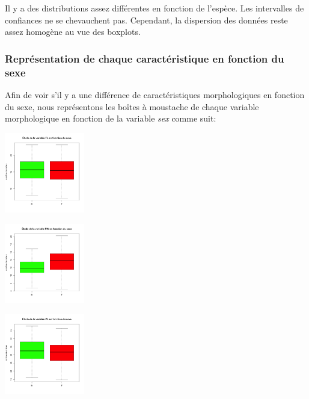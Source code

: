 \documentclass[10pt]{article}
\begin{document}
	Il y a des distributions assez différentes en fonction de l'espèce. Les intervalles de confiances ne se chevauchent pas. Cependant, la dispersion des données reste assez homogène au vue des boxplots.
	\subsubsection{Représentation de chaque caractéristique en fonction du sexe}
	
	Afin de voir s'il y a une différence de caractéristiques morphologiques en fonction du sexe, nous représentons les boîtes à moustache de chaque variable morphologique en fonction de la variable \textit{sex} comme suit:
	
	\begin{center}
		\begin{minipage}[t]{0.3\textwidth}
			\includegraphics[width=35mm]{Figures/Crabs/bxp_sex_fl.png}
		\end{minipage}
		\begin{minipage}[t]{0.3\textwidth}
			\includegraphics[width=35mm]{Figures/Crabs/bxp_sex_rw.png}	
		\end{minipage}
		\begin{minipage}[t]{0.3\textwidth}
			\includegraphics[width=35mm]{Figures/Crabs/bxp_sex_cl.png}
		\end{minipage}
		\newline
		\begin{minipage}[t]{0.4\textwidth}

\end{minipage}
\end{center}
\end{document}
